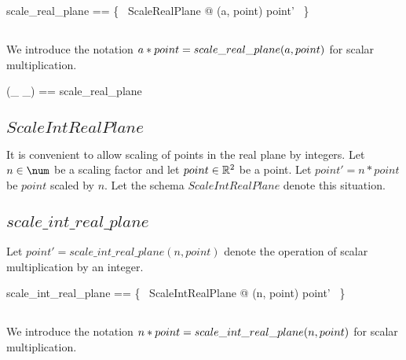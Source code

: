 \documentclass[11pt, oneside]{article}
\begin{document}
\begin{zed}
	scale\_real\_plane == \{~ ScaleRealPlane @ (a, point) \mapsto point' ~\}
\end{zed}

\subsection{}

We introduce the notation $a \mathbin{*} point = scale\_real\_plane(a, point)$
for scalar multiplication.

\begin{zed}
	(\_ \smulRtwo \_) == scale\_real\_plane
\end{zed}

\subsection{$ScaleIntRealPlane$}

It is convenient to allow scaling of points in the real plane by integers.
Let $n \in \num$ be a scaling factor and let $point \in \mathbb{R}^2$ be a point.
Let $point' = n * point$ be  $point$ scaled by $n$.
Let the schema $ScaleIntRealPlane$ denote this situation.


\subsection{$scale\_int\_real\_plane$}

Let $point' = scale\_int\_real\_plane(n, point)$ denote the operation of scalar multiplication
by an integer.

\begin{zed}
	scale\_int\_real\_plane == \{~ ScaleIntRealPlane @ (n, point) \mapsto point' ~\}
\end{zed}

\subsection{}

We introduce the notation $n \mathbin{*} point = scale\_int\_real\_plane(n, point)$
for scalar multiplication.
\end{document}

